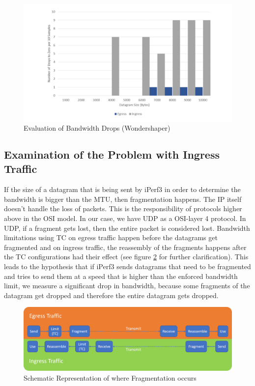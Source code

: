 \begin{figure}[h]
	\centering
	\includegraphics[width=\textwidth]{img/Evaluation-Zeros-Wondershaper.png}
	\caption{Evaluation of Bandwidth Drops (Wondershaper)}
	\label{Evaluation of the Bandwidth Drops (Wondershaper)}
\end{figure}

\newpage

\subsection{Examination of the Problem with Ingress Traffic}\label{Examination of the Problem with Ingress Traffic}

If the size of a datagram that is being sent by iPerf3 in order to determine the bandwidth is bigger than the \acs{MTU}, then fragmentation happens. The \acl{IP} itself doesn't handle the loss of packets. This is the responsibility of protocols higher above in the \acs{OSI} model. In our case, we have \acs{UDP} as a  \acs{OSI}-layer 4 protocol. In \acs{UDP}, if a fragment gets lost, then the entire packet is considered lost. Bandwidth limitations using \acs{TC} on egress traffic happen before the datagrams get fragmented and on ingress traffic, the reassembly of the fragments happens after the \acs{TC} configurations had their effect (see figure \ref{Schematic Representation of where Fragmentation occurs} for further clarification). This leads to the hypothesis that if iPerf3 sends datagrams that need to be fragmented and tries to send them at a speed that is higher than the enforced bandwidth limit, we measure a significant drop in bandwidth, because some fragments of the datagram get dropped and therefore the entire datagram gets dropped.

\begin{figure}[h]
	\centering
	\includegraphics[width=\textwidth]{img/Fragmentation.png}
	\caption{Schematic Representation of where Fragmentation occurs}
	\label{Schematic Representation of where Fragmentation occurs}
\end{figure}

